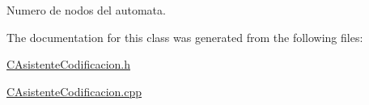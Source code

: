 Numero de nodos del automata. 



The documentation for this class was generated from the following files\+:\begin{DoxyCompactItemize}
\item 
\hyperlink{CAsistenteCodificacion_8h}{C\+Asistente\+Codificacion.\+h}\item 
\hyperlink{CAsistenteCodificacion_8cpp}{C\+Asistente\+Codificacion.\+cpp}\end{DoxyCompactItemize}
